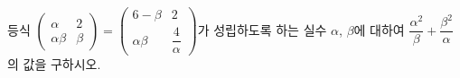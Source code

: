\hspace*{2mm}\begin{minipage}[t]{\dimexpr\linewidth-2mm\relax}\vspace{0pt}
등식 $\begin{pmatrix} \alpha & 2 \\ \alpha\beta & \beta \end{pmatrix}=\begin{pmatrix} 6-\beta & 2 \\ \alpha\beta & \dfrac{4}{\alpha} \end{pmatrix}$가 성립하도록 하는 실수 $\alpha$, $\beta$에 대하여 $\dfrac{\alpha^2}{\beta}+\dfrac{\beta^2}{\alpha}$의 값을 구하시오.\end{minipage}
